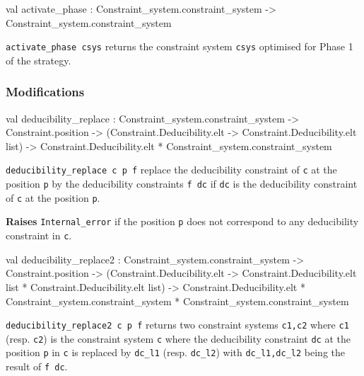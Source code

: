 \begin{ocamldocsigend}


\label{val:Constraint-underscoresystem.Phase-underscore1.activate-underscorephase}\begin{ocamldoccode}
val activate_phase :
  Constraint_system.constraint_system -> Constraint_system.constraint_system
\end{ocamldoccode}
\begin{ocamldocdescription}
{\tt{activate\_phase csys}} returns the constraint system {\tt{csys}} optimised for Phase 1 of the strategy.


\end{ocamldocdescription}


\subsubsection{Modifications}


\label{val:Constraint-underscoresystem.Phase-underscore1.deducibility-underscorereplace}\begin{ocamldoccode}
val deducibility_replace :
  Constraint_system.constraint_system ->
  Constraint.position ->
  (Constraint.Deducibility.elt -> Constraint.Deducibility.elt list) ->
  Constraint.Deducibility.elt * Constraint_system.constraint_system
\end{ocamldoccode}
\begin{ocamldocdescription}
{\tt{deducibility\_replace c p f}} replace the deducibility constraint of {\tt{c}} at the position {\tt{p}} by the deducibility constraints {\tt{f dc}}
      if {\tt{dc}} is the deducibility constraint of {\tt{c}} at the position {\tt{p}}.

{\bf Raises} {\tt{Internal\_error}} if the position {\tt{p}} does not correspond to any deducibility constraint in {\tt{c}}.


\end{ocamldocdescription}


\label{val:Constraint-underscoresystem.Phase-underscore1.deducibility-underscorereplace2}\begin{ocamldoccode}
val deducibility_replace2 :
  Constraint_system.constraint_system ->
  Constraint.position ->
  (Constraint.Deducibility.elt ->
   Constraint.Deducibility.elt list * Constraint.Deducibility.elt list) ->
  Constraint.Deducibility.elt * Constraint_system.constraint_system *
  Constraint_system.constraint_system
\end{ocamldoccode}
\begin{ocamldocdescription}
{\tt{deducibility\_replace2 c p f}} returns two constraint systems {\tt{c1,c2}} where {\tt{c1}} (resp. {\tt{c2}}) is the constraint system {\tt{c}} where 
      the deducibility constraint {\tt{dc}} at the position {\tt{p}} in {\tt{c}} is replaced by {\tt{dc\_l1}} (resp. {\tt{dc\_l2}}) with {\tt{dc\_l1,dc\_l2}}
      being the result of {\tt{f dc}}.


\end{ocamldocdescription}
\end{ocamldocsigend}
